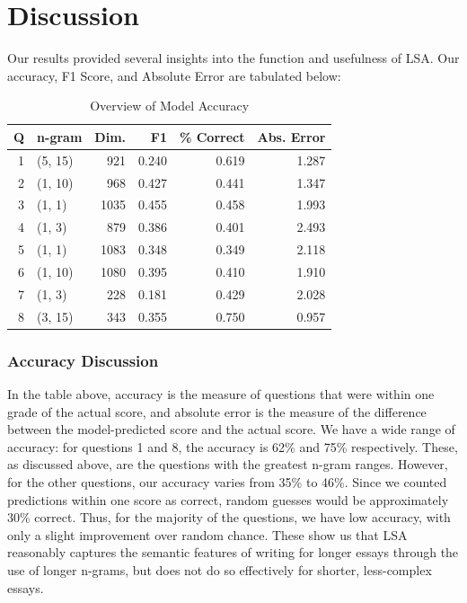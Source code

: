 \documentclass[10pt,letterpaper]{article}
\begin{document}
\section{Discussion}
Our results provided several insights into the function and usefulness of LSA. Our accuracy, F1 Score, and Absolute Error are tabulated below:

\begin{table}[!ht]
\begin{center} 
\caption{Overview of Model Accuracy} 
\vskip 0.12in
\begin{tabular}{rlrrrr}
\toprule
 Q &    n-gram &  Dim. &     F1 &  \% Correct &  Abs. Error \\
\midrule
        1 &  (5, 15) &   921 &  0.240 &      0.619 &           1.287 \\
        2 &  (1, 10) &   968 &  0.427 &      0.441 &           1.347 \\
        3 &   (1, 1) &  1035 &  0.455 &      0.458 &           1.993 \\
        4 &   (1, 3) &   879 &  0.386 &      0.401 &           2.493 \\
        5 &   (1, 1) &  1083 &  0.348 &      0.349 &           2.118 \\
        6 &  (1, 10) &  1080 &  0.395 &      0.410 &           1.910 \\
        7 &   (1, 3) &   228 &  0.181 &      0.429 &           2.028 \\
        8 &  (3, 15) &   343 &  0.355 &      0.750 &           0.957 \\
\bottomrule
\end{tabular}
\end{center} 
\end{table}

\subsubsection{Accuracy Discussion}

In the table above, accuracy is the measure of questions that were within one grade of the actual score, and absolute error is the measure of the difference between the model-predicted score and the actual score. We have a wide range of accuracy: for questions 1 and 8, the accuracy is 62\% and 75\% respectively. These, as discussed above, are the questions with the greatest n-gram ranges. However, for the other questions, our accuracy varies from 35\% to 46\%. Since we counted predictions within one score as correct, random guesses would be approximately 30\% correct. Thus, for the majority of the questions, we have low accuracy, with only a slight improvement over random chance. These show us that LSA reasonably captures the semantic features of writing for longer essays through the use of longer n-grams, but does not do so effectively for shorter, less-complex essays.
\end{document}
